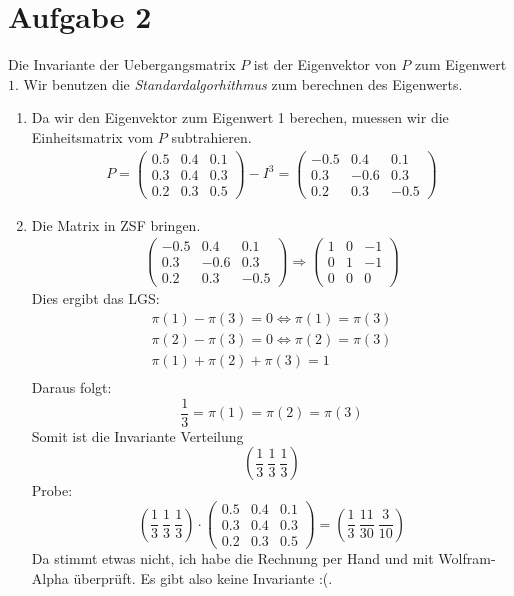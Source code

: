 \documentclass[10pt,a4paper,parskip=half]{scrartcl}
\begin{document}
\section*{Aufgabe 2}
Die Invariante der Uebergangsmatrix $P$ ist der Eigenvektor von $P$ zum Eigenwert $1$. Wir benutzen die \textit{Standardalgorhithmus} zum berechnen des Eigenwerts.
\begin{enumerate}
\item Da wir den Eigenvektor zum Eigenwert 1 berechen, muessen wir die Einheitsmatrix vom $P$ subtrahieren.
\begin{align*}
P = \left(\begin{matrix}
0.5 & 0.4 & 0.1 \\
0.3 & 0.4 & 0.3 \\
0.2 & 0.3 & 0.5
\end{matrix}\right) - I^3 =
\left(\begin{matrix}
-0.5 & 0.4 & 0.1 \\
0.3 & -0.6 & 0.3 \\
0.2 & 0.3 & -0.5
\end{matrix}\right)
\end{align*}
\item Die Matrix in ZSF bringen.
\begin{align*}
\left(\begin{matrix}
-0.5 & 0.4 & 0.1 \\
0.3 & -0.6 & 0.3 \\
0.2 & 0.3 & -0.5
\end{matrix}\right) \Rightarrow
\left(\begin{matrix}
1 & 0 & -1 \\
0 & 1 & -1 \\
0 & 0 & 0
\end{matrix}\right)
\end{align*}
Dies ergibt das LGS:
\begin{align*}
\pi(1) - \pi(3) = 0 \Leftrightarrow \pi(1) = \pi(3) \\
\pi(2) - \pi(3) = 0 \Leftrightarrow \pi(2) = \pi(3) \\
\pi(1) + \pi(2) + \pi(3) = 1 \\
\end{align*}
Daraus folgt:
$$\frac13 = \pi(1) = \pi(2) = \pi(3)$$
Somit ist die Invariante Verteilung $$\left(\frac13 ~ \frac13 ~ \frac13\right)$$
Probe:
$$\left(\frac13 ~ \frac13 ~ \frac13\right) \cdot \left(\begin{matrix}
0.5 & 0.4 & 0.1 \\
0.3 & 0.4 & 0.3 \\
0.2 & 0.3 & 0.5
\end{matrix}\right) = \left(\frac13 ~ \frac{11}{30} ~ \frac{3}{10}\right)$$
Da stimmt etwas nicht, ich habe die Rechnung per Hand und mit Wolfram-Alpha überprüft.
Es gibt also keine Invariante :(.
\end{enumerate}
\end{document}
